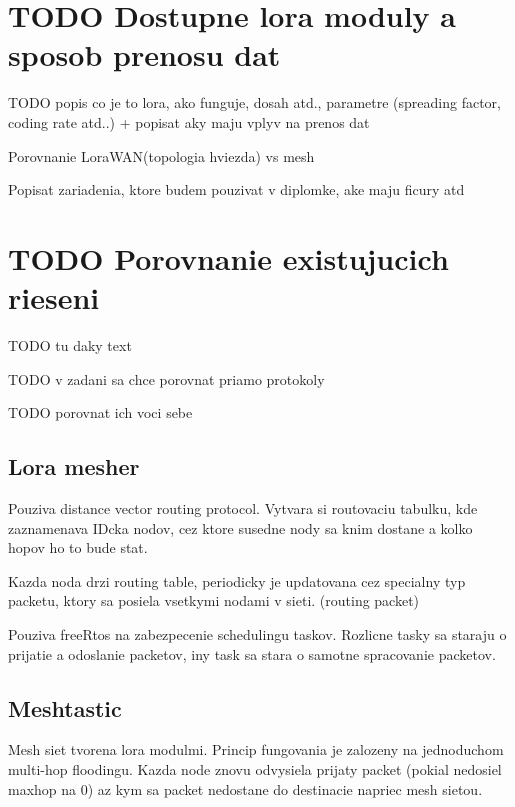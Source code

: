 \documentclass[czech,master]{diploma}
\begin{document}
\MakeTitlePages



\chapter{TODO Dostupne lora moduly a sposob prenosu dat}
TODO popis co je to lora, ako funguje, dosah atd., parametre (spreading factor, coding rate atd..) + popisat aky maju vplyv na prenos dat

Porovnanie LoraWAN(topologia hviezda) vs mesh

Popisat zariadenia, ktore budem pouzivat v diplomke, ake maju ficury atd

\chapter{TODO Porovnanie existujucich rieseni}
TODO tu daky text

TODO v zadani sa chce porovnat priamo protokoly

TODO porovnat ich voci sebe

\section{Lora mesher}
Pouziva distance vector routing protocol.
Vytvara si routovaciu tabulku, kde zaznamenava IDcka nodov, cez ktore susedne nody sa knim dostane a kolko hopov ho to bude stat.

Kazda noda drzi routing table, periodicky je updatovana cez specialny typ packetu, ktory sa posiela vsetkymi nodami v sieti. (routing packet)

Pouziva freeRtos na zabezpecenie schedulingu taskov. Rozlicne tasky sa staraju o prijatie a odoslanie packetov, iny task sa stara o samotne spracovanie packetov.

\section{Meshtastic}
Mesh siet tvorena lora modulmi. Princip fungovania je zalozeny na jednoduchom multi-hop floodingu.
Kazda node znovu odvysiela prijaty packet (pokial nedosiel maxhop na 0) az kym sa packet nedostane do destinacie napriec mesh sietou.
\end{document}
